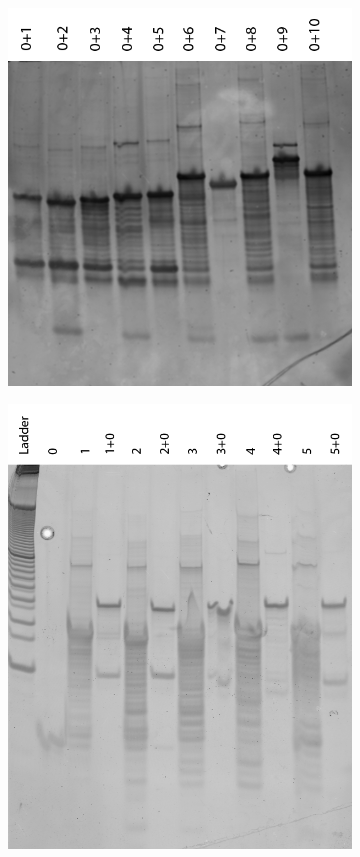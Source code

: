 \begin{figure}[h]
\begin{subfigure}[t]{0.54\textwidth}
\includegraphics[width=\textwidth]{images/promoter_annealing_gel.png}
\caption{}
\label{promoter_annealing_gel}
\end{subfigure}
\begin{subfigure}[t]{0.46\textwidth}
  \includegraphics[width=\textwidth]{images/translator_annealing_2.png}

\end{subfigure}
\end{figure}
